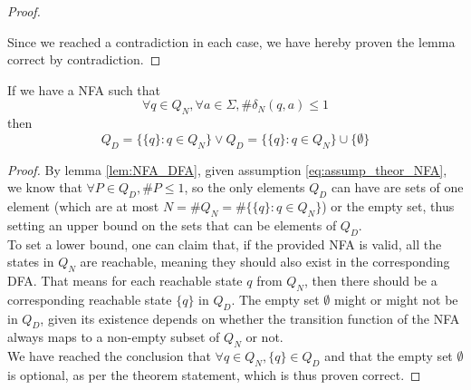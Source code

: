 {\begin{proof}
\begin{enumerate}
	\end{enumerate}
	Since we reached a contradiction in each case, we have hereby proven the lemma correct by contradiction. 
\end{proof}
\begin{theorem}
	If we have a NFA such that
	\begin{equation} \label{eq:assump_theor_NFA}
		\forall q \in Q_N, \forall a \in \Sigma, \#\delta_N(q,a)\leq 1
	\end{equation}
	then
	\begin{equation}
		Q_D=\{\{q\}:q\in Q_N\} \vee Q_D=\{\{q\}:q\in Q_N\} \cup \{\emptyset\}
	\end{equation}
\end{theorem}
\begin{proof}
	By lemma \ref{lem:NFA_DFA}, given assumption \eqref{eq:assump_theor_NFA}, we know that $\forall P \in Q_D, \#P \leq 1$, so the only elements $Q_D$ can have are sets of one element (which are at most $N = \#Q_N=\#\{\{q\}:q\in Q_N\}$) or the empty set, thus setting an upper bound on the sets that can be elements of $Q_D$.\\
	To set a lower bound, one can claim that, if the provided NFA is valid, all the states in $Q_N$ are reachable, meaning they should also exist in the corresponding DFA. That means for each reachable state $q$ from $Q_N$, then there should be a corresponding reachable state $\{q\}$ in $Q_D$. The empty set $\emptyset$ might or might not be in $Q_D$, given its existence depends on whether the transition function of the NFA always maps to a non-empty subset of $Q_N$ or not.\\
	We have reached the conclusion that $\forall q \in Q_N, \{q\} \in Q_D$ and that the empty set $\emptyset$ is optional, as per the theorem statement, which is thus proven correct.
\end{proof}
}

